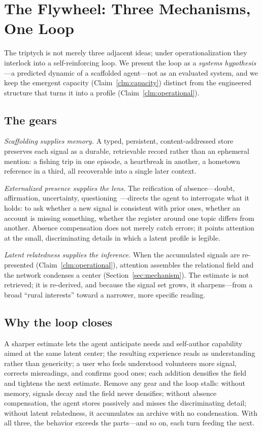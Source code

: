 \documentclass[conference]{IEEEtran}
\theoremstyle{definition}
\begin{document}
\section{The Flywheel: Three Mechanisms, One Loop}
\label{sec:flywheel}

The triptych is not merely three adjacent ideas; under operationalization they interlock into a self-reinforcing loop. We present the loop as a \emph{systems hypothesis}---a predicted dynamic of a scaffolded agent---not as an evaluated system, and we keep the emergent capacity (Claim~\ref{clm:capacity}) distinct from the engineered structure that turns it into a profile (Claim~\ref{clm:operational}).

\subsection{The gears}
\emph{Scaffolding supplies memory.} A typed, persistent, content-addressed store~\cite{scaffolding} preserves each signal as a durable, retrievable record rather than an ephemeral mention: a fishing trip in one episode, a heartbreak in another, a hometown reference in a third, all recoverable into a single later context.

\emph{Externalized presence supplies the lens.} The reification of absence---doubt, affirmation, uncertainty, questioning~\cite{absence}---directs the agent to interrogate what it holds: to ask whether a new signal is consistent with prior ones, whether an account is missing something, whether the register around one topic differs from another. Absence compensation does not merely catch errors; it points attention at the small, discriminating details in which a latent profile is legible.

\emph{Latent relatedness supplies the inference.} When the accumulated signals are re-presented (Claim~\ref{clm:operational}), attention assembles the relational field and the network condenses a center (Section~\ref{sec:mechanism}). The estimate is not retrieved; it is re-derived, and because the signal set grows, it sharpens---from a broad ``rural interests'' toward a narrower, more specific reading.

\subsection{Why the loop closes}
A sharper estimate lets the agent anticipate needs and self-author capability aimed at the same latent center; the resulting experience reads as understanding rather than genericity; a user who feels understood volunteers more signal, corrects misreadings, and confirms good ones; each addition densifies the field and tightens the next estimate. Remove any gear and the loop stalls: without memory, signals decay and the field never densifies; without absence compensation, the agent stores passively and misses the discriminating detail; without latent relatedness, it accumulates an archive with no condensation. With all three, the behavior exceeds the parts---and so on, each turn feeding the next.
\end{document}

